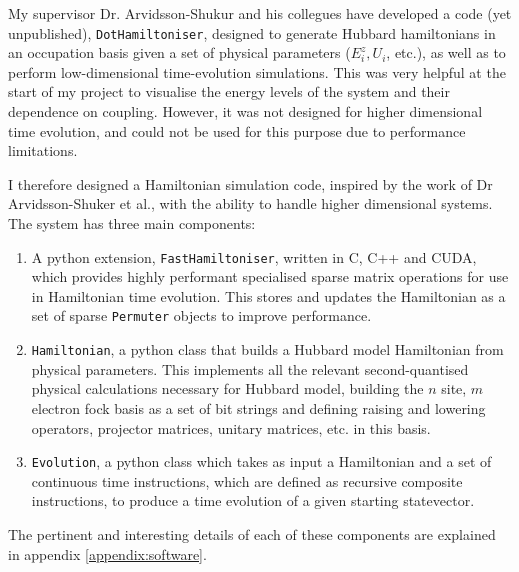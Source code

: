 \documentclass{report}
\begin{document}
My supervisor Dr. Arvidsson-Shukur and his collegues have developed a code (yet unpublished), \texttt{DotHamiltoniser}, designed to generate Hubbard hamiltonians in an occupation basis given a set of physical parameters ($E_i^z, U_i$, etc.), as well as to perform low-dimensional time-evolution simulations. This was very helpful at the start of my project to visualise the energy levels of the system and their dependence on coupling. However, it was not designed for higher dimensional time evolution, and could not be used for this purpose due to performance limitations.

I therefore designed a Hamiltonian simulation code, inspired by the work of Dr Arvidsson-Shuker et al., with the ability to handle higher dimensional systems. The system has three main components: 
\begin{enumerate}
    \item A python extension, \texttt{FastHamiltoniser}, written in C, C++ and CUDA, which provides highly performant specialised sparse matrix operations for use in Hamiltonian time evolution. This stores and updates the Hamiltonian as a set of sparse \texttt{Permuter} objects to improve performance.
    \item \texttt{Hamiltonian}, a python class that builds a Hubbard model Hamiltonian from physical parameters. This implements all the relevant second-quantised physical calculations necessary for Hubbard model, building the $n$ site, $m$ electron fock basis as a set of bit strings and defining raising and lowering operators, projector matrices, unitary matrices, etc. in this basis.
    \item \texttt{Evolution}, a python class which takes as input a Hamiltonian and a set of continuous time instructions, which are defined as recursive composite instructions, to produce a time evolution of a given starting statevector.
\end{enumerate}

The pertinent and interesting details of each of these components are explained in appendix \ref{appendix:software}.
\end{document}
